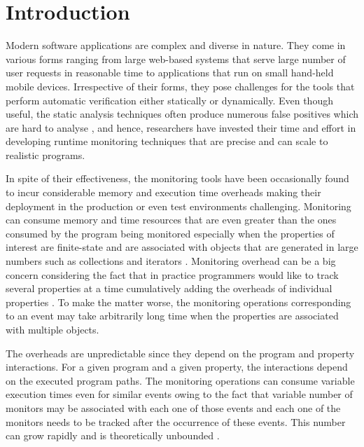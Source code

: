 \section{Introduction}
\label{sec:introduction}

Modern software applications are complex and diverse in nature. They come in 
various forms ranging from large web-based systems that serve large number of 
user requests in reasonable time to applications that run on small 
hand-held mobile devices. Irrespective of their forms, they pose challenges for 
the tools that perform automatic verification either statically or dynamically. 
Even though useful, the static analysis techniques often produce numerous false 
positives which are hard to analyse \cite{}, and hence, researchers have 
invested their time and effort in developing runtime monitoring techniques that 
are precise and can scale to realistic programs.

In spite of their effectiveness, the monitoring tools have been occasionally 
found to incur considerable memory and execution time overheads making their deployment
in the production or even test environments challenging. Monitoring
can consume memory and time resources that are even greater than the 
ones consumed by the program being monitored especially when the properties of interest
are finite-state and are associated with objects that are generated
in large numbers such as collections and iterators \cite{}. Monitoring overhead can be a big
concern considering the fact that in 
practice programmers would like to track several properties at a time cumulatively adding the overheads of
individual properties \cite{}. To make the matter worse, the monitoring operations corresponding to an
event may take arbitrarily long time when the properties are associated with multiple objects.

The overheads are unpredictable since they depend on the program and 
property interactions. For a given program and a given property, the 
interactions depend on the executed program paths. The monitoring operations
can consume variable execution times even for similar events owing to the fact that variable number of 
monitors may be associated with each one of those events and each one of the 
monitors needs to be tracked after the occurrence of these events. This number can grow
rapidly and is theoretically unbounded \cite{}.

